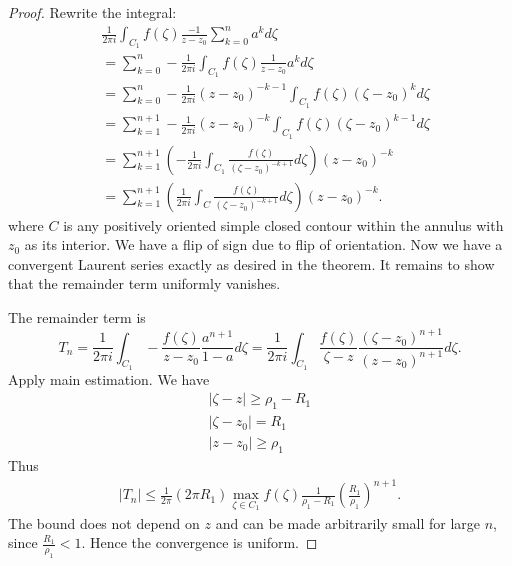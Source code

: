 \begin{proof}
	Rewrite the integral:
	\begin{align*}
		&\frac{1}{2 \pi i}\int _{C_1} f(\zeta) \frac{-1}{z - z_0}\sum_{k = 0}^n a^k d\zeta\\
		&=\sum_{k=0}^{n}-\frac{1}{2 \pi i} \int _{C_1} f(\zeta) \frac{1}{z - z_0}a^k d\zeta\\
		&=\sum_{k=0}^{n}-\frac{1}{2 \pi i} (z-z_0)^{-k-1} \int _{C_1} f(\zeta) (\zeta - z_0)^k d\zeta\\
		&=\sum_{k=1}^{n+1}-\frac{1}{2 \pi i} (z-z_0)^{-k} \int _{C_1} f(\zeta) (\zeta - z_0)^{k-1} d\zeta\\
		&=\sum_{k=1}^{n+1}\left( -\frac{1}{2 \pi i} \int _{C_1} \frac{f(\zeta)}{(\zeta - z_0)^{-k+1}} d\zeta \right)  (z-z_0)^{-k} \\
		&=\sum_{k=1}^{n+1}\left( \frac{1}{2 \pi i} \int _{C} \frac{f(\zeta)}{(\zeta - z_0)^{-k+1}} d\zeta \right)  (z-z_0)^{-k}
	.\end{align*} 
	where $C$ is any positively oriented simple closed contour within the annulus with $z_0$ as its interior. We have a flip of sign due to flip of orientation. Now we have a convergent Laurent series exactly as desired in the theorem. It remains to show that the remainder term uniformly vanishes.

	The remainder term is
	\[
		T_n = \frac{1}{2 \pi i} \int_{C_1}- \frac{f(\zeta)}{z - z_0} \frac{a^{n+1}}{1-a}d \zeta 
		= \frac{1}{2 \pi i}\int_{C_1}\frac{f(\zeta) }{\zeta - z}\frac{(\zeta - z_0)^{n+1}}{(z- z_0)^{n+1}} d \zeta
	.\] 
	Apply main estimation. We have
	\begin{gather}
		|\zeta - z| \ge \rho_1 - R_1 \\
		| \zeta - z_0| = R_1 \\
		|z - z_0| \ge \rho_1
	\end{gather}
	Thus
	\begin{align*}
		|T_n| \le \frac{1}{2 \pi} (2 \pi R_1) \max_{\zeta \in C_1}f(\zeta) \frac{1}{\rho_1 - R_1} \left( \frac{R_1}{\rho_1} \right) ^{n+1}
	.\end{align*}
	The bound does not depend on $z$ and can be made arbitrarily small for large $n$, since $\frac{R_1}{\rho_1}<1$. Hence the convergence is uniform.
\end{proof}

